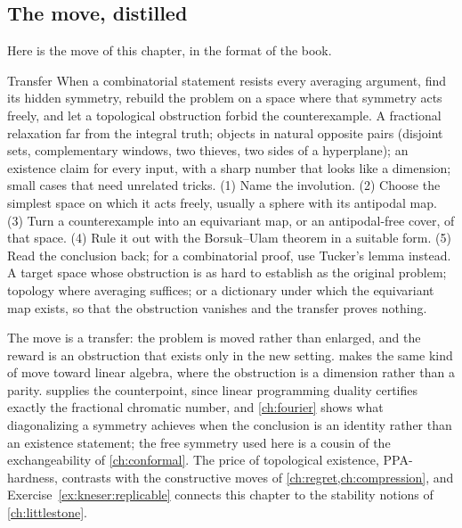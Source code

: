 \begin{refsection}
\section{The move, distilled}\label{sec:kneser:distilled}

Here is the move of this chapter, in the format of the book.

\begin{move}{Transfer}
 When a combinatorial statement resists every averaging argument, find its hidden symmetry, rebuild the problem on a space where that symmetry acts freely, and let a topological obstruction forbid the counterexample.
 A fractional relaxation far from the integral truth; objects in natural opposite pairs (disjoint sets, complementary windows, two thieves, two sides of a hyperplane); an existence claim for every input, with a sharp number that looks like a dimension; small cases that need unrelated tricks.
 (1) Name the involution. (2) Choose the simplest space on which it acts freely, usually a sphere with its antipodal map. (3) Turn a counterexample into an equivariant map, or an antipodal-free cover, of that space. (4) Rule it out with the Borsuk--Ulam theorem in a suitable form. (5) Read the conclusion back; for a combinatorial proof, use Tucker's lemma instead.
 A target space whose obstruction is as hard to establish as the original problem; topology where averaging suffices; or a dictionary under which the equivariant map exists, so that the obstruction vanishes and the transfer proves nothing.
\end{move}


The move is a transfer: the problem is moved rather than enlarged, and the reward is an obstruction that exists only in the new setting.  makes the same kind of move toward linear algebra, where the obstruction is a dimension rather than a parity.  supplies the counterpoint, since linear programming duality certifies exactly the fractional chromatic number, and \cref{ch:fourier} shows what diagonalizing a symmetry achieves when the conclusion is an identity rather than an existence statement; the free symmetry used here is a cousin of the exchangeability of \cref{ch:conformal}. The price of topological existence, PPA-hardness, contrasts with the constructive moves of \cref{ch:regret,ch:compression}, and Exercise~\ref{ex:kneser:replicable} connects this chapter to the stability notions of \cref{ch:littlestone}.


\end{refsection}

